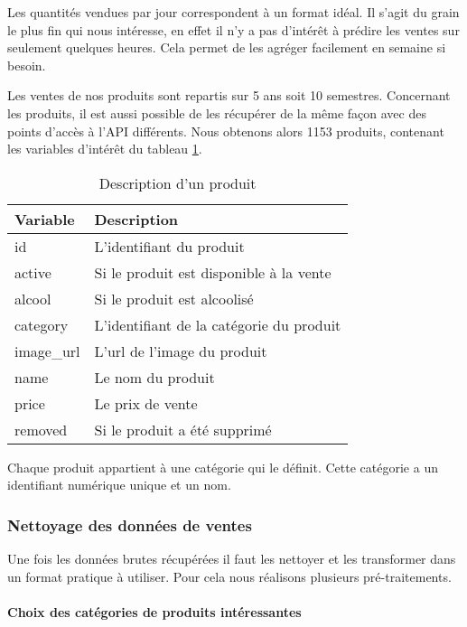 Les quantités vendues par jour correspondent à un format idéal. Il s'agit du grain le plus fin qui nous intéresse, en effet il n'y a pas d'intérêt à prédire les ventes sur seulement quelques heures. Cela permet de les agréger facilement en semaine si besoin.

Les ventes de nos produits sont repartis sur 5 ans soit 10 semestres.
Concernant les produits, il est aussi possible de les récupérer de la même façon avec des points d'accès à l'API différents. Nous obtenons alors 1153 produits, contenant les variables d'intérêt du tableau \ref{tab:product_description}.

\begin{table}[ht]
    \centering
    \begin{tabular}{l|l}
        Variable        & Description \\
        \hline
        id              & L'identifiant du produit \\
        active          & Si le produit est disponible à la vente \\
        alcool          & Si le produit est alcoolisé \\
        category        & L'identifiant de la catégorie du produit \\
        image\_url      & L'url de l'image du produit \\
        name            & Le nom du produit \\
        price           & Le prix de vente \\
        removed         & Si le produit a été supprimé
    \end{tabular}
    \caption{Description d'un produit}
    \label{tab:product_description}
\end{table}

Chaque produit appartient à une catégorie qui le définit. Cette catégorie a un identifiant numérique unique et un nom.


\subsubsection{Nettoyage des données de ventes}
\label{subsec:data_ventes_preproccess}

Une fois les données brutes récupérées il faut les nettoyer et les transformer dans un format pratique à utiliser. Pour cela nous réalisons plusieurs pré-traitements.

\paragraph{Choix des catégories de produits intéressantes}
\label{par:choice_categories}

